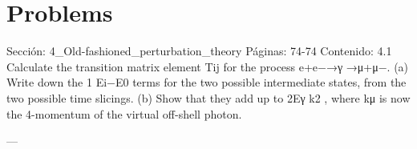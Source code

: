 \section*{Problems}
Sección: 4_Old-fashioned_perturbation_theory
Páginas: 74-74
Contenido:
4.1 Calculate the transition matrix element Tij for the process e+e−→γ →μ+μ−.
(a) Write down the
1
Ei−E0 terms for the two possible intermediate states, from the
two possible time slicings.
(b) Show that they add up to 2Eγ
k2 , where kμ is now the 4-momentum of the virtual
off-shell photon.


---

